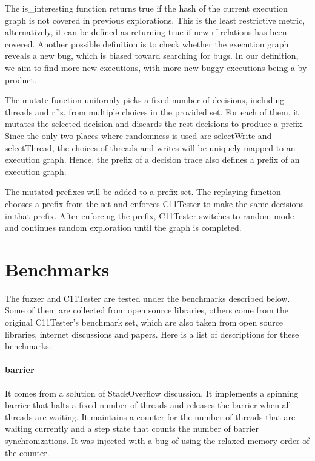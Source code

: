 The is\_interesting function returns true if the hash of the current execution graph is not covered in previous explorations. This is the least restrictive metric, alternatively, it can be defined as returning true if new rf relations has been covered. Another possible definition is to check whether the execution graph reveals a new bug, which is biased toward searching for bugs. In our definition, we aim to find more new executions, with more new buggy executions being a by-product.

The mutate function uniformly picks a fixed number of decisions, including threads and rf's, from multiple choices in the provided set. For each of them, it mutates the selected decision and discards the rest decisions to produce a prefix. Since the only two places where randomness is used are selectWrite and selectThread, the choices of threads and writes will be uniquely mapped to an execution graph. Hence, the prefix of a decision trace also defines a prefix of an execution graph.


The mutated prefixes will be added to a prefix set. The replaying function chooses a prefix from the set and enforces C11Tester to make the same decisions in that prefix. After enforcing the prefix, C11Tester switches to random mode and continues random exploration until the graph is completed.

\section{Benchmarks}

The fuzzer and C11Tester are tested under the benchmarks described below. Some of them are collected from open source libraries, others come from the original C11Tester's benchmark set, which are also taken from open source libraries, internet discussions and papers. Here is a list of descriptions for these benchmarks:

\paragraph{barrier} It comes from a solution of StackOverflow discussion. It implements a spinning barrier that halts a fixed number of threads and releases the barrier when all threads are waiting. It maintains a counter for the number of threads that are waiting currently and a step state that counts the number of barrier synchronizations. It was injected with a bug of using the relaxed memory order of the counter.

